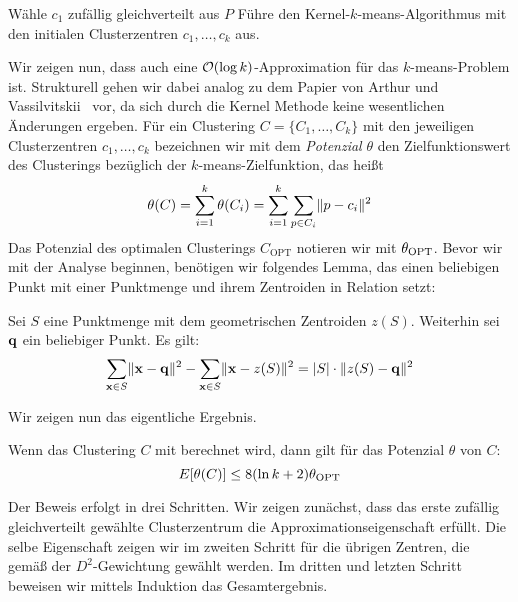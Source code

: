 \begin{algorithm}
\label{algo:kernelkmeanspp}
\caption{\kkmpp}
	\DontPrintSemicolon
	
	\BlankLine
	
	Wähle $c_1$ zufällig gleichverteilt aus $P$\;
	Führe den Kernel-$k$-means-Algorithmus mit den initialen Clusterzentren $c_1, \dots, c_k$ aus.
\end{algorithm}
Wir zeigen nun, dass auch \kkmpp{} eine $\mathcal{O}(\log k)$-Approximation für das $k$-means-Problem ist. Strukturell gehen
wir dabei analog zu dem Papier von Arthur und Vassilvitskii~\cite{ArthurV07} vor, da sich durch die Kernel Methode keine
wesentlichen Änderungen ergeben. Für ein Clustering $C = \{ C_1, \dots, C_k \}$ mit den jeweiligen Clusterzentren
$c_1, \dots, c_k$ bezeichnen wir mit dem \emph{Potenzial} $\theta$ den Zielfunktionswert des Clusterings bezüglich der
$k$-means-Zielfunktion, das heißt
\[ \theta(C) = \sum_{i=1}^k \theta(C_i) = \sum_{i=1}^k \sum_{p \in C_i} \lVert {p} - {c_i} \rVert^2 \]
Das Potenzial des optimalen Clusterings $C_\textrm{OPT}$ notieren wir mit $\theta_{\textrm{OPT}}$. Bevor wir mit der Analyse beginnen,
benötigen wir folgendes Lemma, das einen beliebigen Punkt mit einer Punktmenge und ihrem Zentroiden in Relation setzt:

\begin{lemma}
\label{lemma:point-centroid}
	Sei $S$ eine Punktmenge mit dem geometrischen Zentroiden $z(S)$. Weiterhin sei $\mathbf{q}$ ein beliebiger Punkt. Es gilt:
	\[ \sum_{\mathbf{x} \in S} \lVert {\ensuremath{\mathbf{x}}} - {\mathbf{q}} \rVert^2 - \sum_{\mathbf{x} \in S} \lVert {\ensuremath{\mathbf{x}}} - {z(S)} \rVert^2
		= \left|S\right| \cdot \lVert {z(S)} - {\mathbf{q}} \rVert^2 \]
\end{lemma}
Wir zeigen nun das eigentliche Ergebnis.

\begin{satz}
\label{thm:kkmpp-ologk-approx}
	Wenn das Clustering $C$ mit \kkmpp{} berechnet wird, dann gilt für das Potenzial $\theta$ von $C$:
	\[ E[\theta(C)] \leq 8 (\ln{k} + 2) \theta_{\textrm{OPT}} \]
\end{satz}
Der Beweis erfolgt in drei Schritten. Wir zeigen zunächst, dass das erste zufällig gleichverteilt gewählte Clusterzentrum
die Approximationseigenschaft erfüllt. Die selbe Eigenschaft zeigen wir im zweiten Schritt für die übrigen Zentren, die gemäß
der $D^2$-Gewichtung gewählt werden. Im dritten und letzten Schritt beweisen wir mittels Induktion das Gesamtergebnis.

